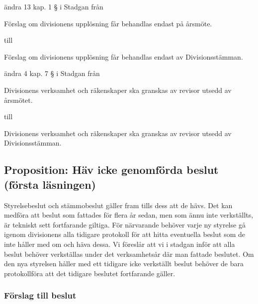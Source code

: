 \documentclass[protokoll]{dvd}
\begin{document}
\begin{attsatser}
	\item ändra 13 kap. 1 § i Stadgan från

	\begin{displayquote}
        Förslag om divisionens upplösning får behandlas endast på årsmöte.
    \end{displayquote}

	till

	\begin{displayquote}
		Förslag om divisionens upplösning får behandlas endast av Divisionsstämman.
	\end{displayquote}

	\item ändra 4 kap. 7 § i Stadgan från

	\begin{displayquote}
        Divisionens verksamhet och räkenskaper ska granskas av revisor utsedd av årsmötet.
    \end{displayquote}

	till

	\begin{displayquote}
		Divisionens verksamhet och räkenskaper ska granskas av revisor utsedd av Divisionsstämman.
	\end{displayquote}
\end{attsatser}

\newpage
\subsection{Proposition: Häv icke genomförda beslut (första läsningen)}

Styrelsebeslut och stämmobeslut gäller fram tills dess att de hävs.
Det kan medföra att beslut som fattades för flera år sedan, men som ännu inte verkställts, är tekniskt sett fortfarande giltiga.
För närvarande behöver varje ny styrelse gå igenom divisionens alla tidigare protokoll för att hitta eventuella beslut som de inte håller med om och häva dessa.
Vi föreslår att vi i stadgan inför att alla beslut behöver verkställas under det verksamhetsår där man fattade beslutet.
Om den nya styrelsen håller med ett tidigare icke verkställt beslut behöver de bara protokollföra att det tidigare beslutet fortfarande gäller.

\subsubsection*{Förslag till beslut}
\end{document}
